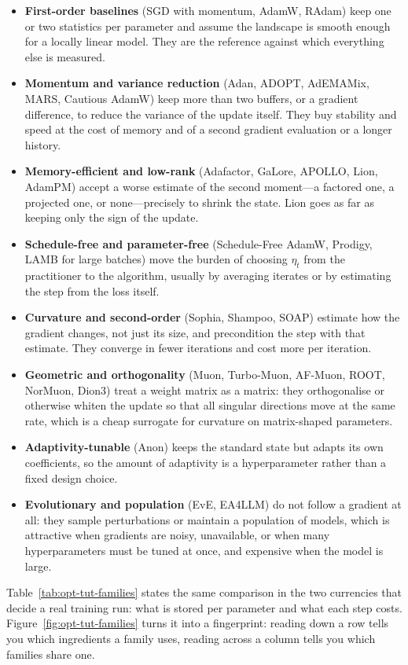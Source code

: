 \begin{itemize}[leftmargin=*]
\item \textbf{First-order baselines} (SGD with momentum, AdamW, RAdam) keep one
or two statistics per parameter and assume the landscape is smooth enough for
a locally linear model. They are the reference against which everything else
is measured.
\item \textbf{Momentum and variance reduction} (Adan, ADOPT, AdEMAMix, MARS,
Cautious AdamW) keep more than two buffers, or a gradient difference, to
reduce the variance of the update itself. They buy stability and speed at the
cost of memory and of a second gradient evaluation or a longer history.
\item \textbf{Memory-efficient and low-rank} (Adafactor, GaLore, APOLLO, Lion,
AdamPM) accept a worse estimate of the second moment---a factored one, a
projected one, or none---precisely to shrink the state. Lion goes as far as
keeping only the sign of the update.
\item \textbf{Schedule-free and parameter-free} (Schedule-Free AdamW,
Prodigy, LAMB for large batches) move the burden of choosing $\eta_t$ from the
practitioner to the algorithm, usually by averaging iterates or by estimating
the step from the loss itself.
\item \textbf{Curvature and second-order} (Sophia, Shampoo, SOAP) estimate how
the gradient changes, not just its size, and precondition the step with that
estimate. They converge in fewer iterations and cost more per iteration.
\item \textbf{Geometric and orthogonality} (Muon, Turbo-Muon, AF-Muon, ROOT,
NorMuon, Dion3) treat a weight matrix as a matrix: they orthogonalise or
otherwise whiten the update so that all singular directions move at the same
rate, which is a cheap surrogate for curvature on matrix-shaped parameters.
\item \textbf{Adaptivity-tunable} (Anon) keeps the standard state but adapts
its own coefficients, so the amount of adaptivity is a hyperparameter rather
than a fixed design choice.
\item \textbf{Evolutionary and population} (EvE, EA4LLM) do not follow a
gradient at all: they sample perturbations or maintain a population of models,
which is attractive when gradients are noisy, unavailable, or when many
hyperparameters must be tuned at once, and expensive when the model is large.
\end{itemize}

Table~\ref{tab:opt-tut-families} states the same comparison in the two
currencies that decide a real training run: what is stored per parameter and
what each step costs. Figure~\ref{fig:opt-tut-families} turns it into a
fingerprint: reading down a row tells you which ingredients a family uses,
reading across a column tells you which families share one.

